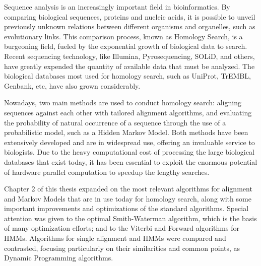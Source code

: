 

	


Sequence analysis is an increasingly important field in bioinformatics. By comparing biological sequences, proteins and nucleic acids, it is possible to unveil previously unknown relations between different organisms and organelles, such as evolutionary links. This comparison process, known as Homology Search, is a burgeoning field, fueled by the exponential growth of biological data to search. Recent sequencing technology, like Illumina, Pyrosequencing, SOLiD, and others, have greatly expended the quantity of available data that must be analyzed. The biological databases most used for homology search, such as UniProt, TrEMBL, Genbank, etc, have also grown considerably.

Nowadays, two main methods are used to conduct homology search: aligning sequences against each other with tailored alignment algorithms, and evaluating the probability of natural occurrence of a sequence through the use of a probabilistic model, such as a Hidden Markov Model. Both methods have been extensively developed and are in widespread use, offering an invaluable service to biologists. Due to the heavy computational cost of processing the large biological databases that exist today, it has been essential to exploit the enormous potential of hardware parallel computation to speedup the lengthy searches.

Chapter 2 of this thesis expanded on the most relevant algorithms for alignment and Markov Models that are in use today for homology search, along with some important improvements and optimizations of the standard algorithms. Special attention was given to the optimal Smith-Waterman algorithm, which is the basis of many optimization efforts; and to the Viterbi and Forward algorithms for HMMs. Algorithms for single alignment and HMMs were compared and contrasted, focusing particularly on their similarities and common points, as Dynamic Programming algorithms.

